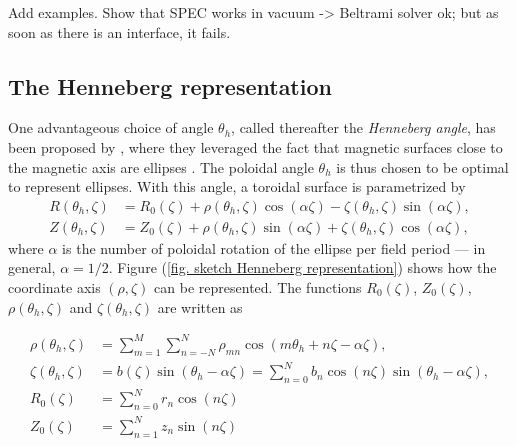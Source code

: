 \documentclass[my_thesis.tex]{subfiles}
\begin{document}
{\color{red} Add examples. Show that SPEC works in vacuum -> Beltrami solver ok; but as soon as there is an interface, it fails.}



\subsection{The Henneberg representation}
One advantageous choice of angle $\theta_h$, called thereafter the \emph{Henneberg angle}, has been proposed by \citet{Henneberg2021}, where they leveraged the fact that magnetic surfaces close to the magnetic axis are ellipses \citep{helanderTheoryPlasmaConfinement2014}. The poloidal angle $\theta_h$ is thus chosen to be optimal to represent ellipses. With this angle, a toroidal surface is parametrized by
\begin{eqnarray}
	R(\theta_h,\zeta) &= R_0(\zeta) + \rho(\theta_h,\zeta)\cos(\alpha \zeta) - \zeta(\theta_h,\zeta)\sin(\alpha \zeta), \label{eq.Rfctrhophi}\\
	Z(\theta_h,\zeta) &= Z_0(\zeta) + \rho(\theta_h,\zeta)\sin(\alpha \zeta) + \zeta(\theta_h,\zeta)\cos(\alpha \zeta),\label{eq.Zfctrhophi}
\end{eqnarray}
where $\alpha$ is the number of poloidal rotation of the ellipse per field period --- in general, $\alpha=1/2$. Figure (\ref{fig. sketch Henneberg representation}) shows how the coordinate axis $(\rho,\zeta)$ can be represented. The functions $R_0(\zeta)$, $Z_0(\zeta)$, $\rho(\theta_h,\zeta)$ and $\zeta(\theta_h,\zeta)$ are written as

\begin{align}
	\rho(\theta_h,\zeta) &= \sum_{m=1}^{M}\sum_{n=-N}^N \rho_{mn}\cos(m\theta_h +n\zeta -\alpha \zeta),\label{eq.rho_series}\\
	\zeta(\theta_h,\zeta) &= b(\zeta)\sin(\theta_h-\alpha\zeta) =  \sum_{n=0}^N b_n\cos(n\zeta)\sin(\theta_h-\alpha \zeta), \label{eq.zeta_series}\\
	R_0(\zeta) &= \sum_{n=0}^{N} r_n \cos(n \zeta)\label{eq.R0_series}\\
	Z_0(\zeta) &= \sum_{n=1}^{N} z_n \sin(n \zeta)\label{eq.Z0_series}
\end{align}
\end{document}
